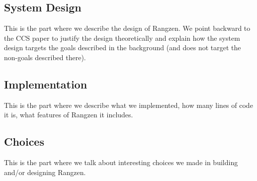 \subsection{System Design}
This is the part where we describe the design of Rangzen. We point backward
to the CCS paper to justify the design theoretically and explain how the system
design targets the goals described in the background (and does not target the
non-goals described there).

\subsection{Implementation}
This is the part where we describe what we implemented, how many lines of
code it is, what features of Rangzen it includes.

\subsection{Choices}
This is the part where we talk about interesting choices we made in building
and/or designing Rangzen.
